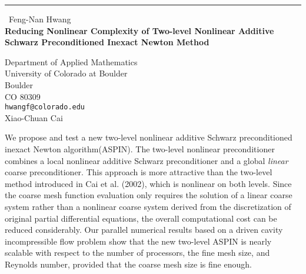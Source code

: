 \documentclass{report}
\begin{document}
\begin{center}
\rule{6in}{1pt} \
{\large Feng-Nan Hwang \\
{\bf Reducing Nonlinear Complexity of Two-level Nonlinear Additive Schwarz Preconditioned Inexact Newton Method}}

Department of Applied Mathematics \\ University of Colorado at Boulder \\ Boulder \\ CO 80309
\\
{\tt hwangf@colorado.edu}\\
Xiao-Chuan Cai\end{center}

We propose and test a new two-level nonlinear additive Schwarz
preconditioned inexact Newton algorithm(ASPIN). The two-level
nonlinear preconditioner combines a local nonlinear additive
Schwarz preconditioner and a global {\it linear} coarse
preconditioner. This approach is more attractive than the
two-level method introduced in Cai et al. (2002), which is nonlinear on
both levels. Since the coarse mesh function evaluation only requires the
solution of a linear coarse system rather than a nonlinear coarse system
derived from the discretization of original partial differential
equations, the overall computational cost can be reduced considerably.
Our parallel numerical results
based on a driven cavity incompressible flow problem show that the
new two-level ASPIN is nearly scalable with respect to the number
of processors, the fine mesh size, and Reynolds number, provided
that the coarse mesh size is fine enough.
\end{document}
